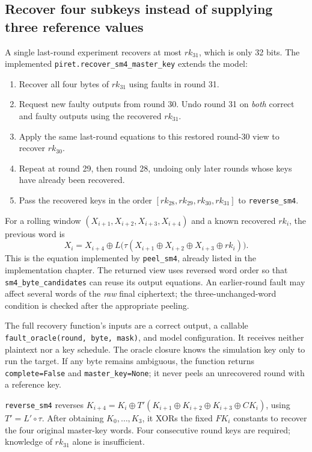 \documentclass[11pt,a4paper]{report}
\newcommand{\xor}{\mathbin{\oplus}}
\begin{document}
\subsection{Recover four subkeys instead of supplying three reference values}
A single last-round experiment recovers at most $rk_{31}$, which is only 32 bits. The implemented \texttt{piret.recover\_sm4\_master\_key} extends the model:
\begin{enumerate}
\item Recover all four bytes of $rk_{31}$ using faults in round 31.
\item Request new faulty outputs from round 30. Undo round 31 on \emph{both} correct and faulty outputs using the recovered $rk_{31}$.
\item Apply the same last-round equations to this restored round-30 view to recover $rk_{30}$.
\item Repeat at round 29, then round 28, undoing only later rounds whose keys have already been recovered.
\item Pass the recovered keys in the order $[rk_{28},rk_{29},rk_{30},rk_{31}]$ to \texttt{reverse\_sm4}.
\end{enumerate}
For a rolling window $(X_{i+1},X_{i+2},X_{i+3},X_{i+4})$ and a known recovered $rk_i$, the previous word is
\[
X_i=X_{i+4}\xor L\bigl(\tau(X_{i+1}\xor X_{i+2}\xor X_{i+3}\xor rk_i)\bigr).
\]
This is the equation implemented by \texttt{peel\_sm4}, already listed in the implementation chapter. The returned view uses reversed word order so that \texttt{sm4\_byte\_candidates} can reuse its output equations. An earlier-round fault may affect several words of the \emph{raw} final ciphertext; the three-unchanged-word condition is checked after the appropriate peeling.

The full recovery function's inputs are a correct output, a callable \texttt{fault\_oracle(round, byte, mask)}, and model configuration. It receives neither plaintext nor a key schedule. The oracle closure knows the simulation key only to run the target. If any byte remains ambiguous, the function returns \texttt{complete=False} and \texttt{master\_key=None}; it never peels an unrecovered round with a reference key.

\texttt{reverse\_sm4} reverses $K_{i+4}=K_i\xor T'(K_{i+1}\xor K_{i+2}\xor K_{i+3}\xor CK_i)$, using $T'=L'\circ\tau$. After obtaining $K_0,\ldots,K_3$, it XORs the fixed $FK_i$ constants to recover the four original master-key words. Four consecutive round keys are required; knowledge of $rk_{31}$ alone is insufficient.
\end{document}
